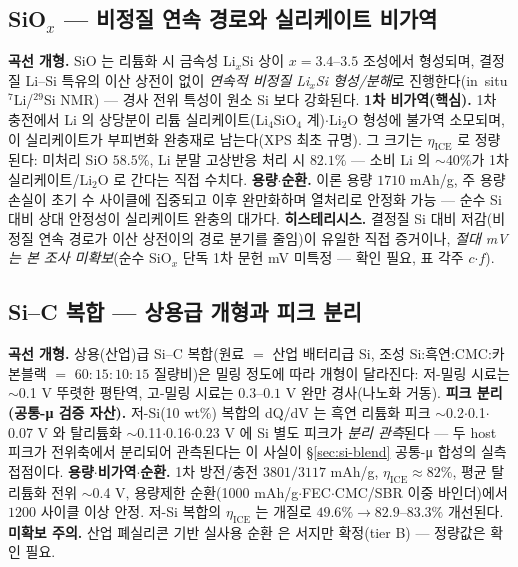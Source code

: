 \subsection{SiO$_x$ --- 비정질 연속 경로와 실리케이트 비가역}\label{ssec:si-siox}
\textbf{곡선 개형.} SiO 는 리튬화 시 금속성 Li$_x$Si 상이 $x{=}3.4$--$3.5$ 조성에서 형성되며, 결정질 Li--Si
특유의 이산 상전이 없이 \emph{연속적 비정질 Li$_x$Si 형성/분해}로 진행한다(in~situ $^7$Li/$^{29}$Si
NMR)\cite{kitada_sio2019} --- 경사 전위 특성이 원소 Si 보다 강화된다. \textbf{1차 비가역(핵심).} 1차
충전에서 Li 의 상당분이 리튬 실리케이트(Li$_4$SiO$_4$ 계)$\cdot$Li$_2$O 형성에 불가역 소모되며, 이
실리케이트가 부피변화 완충재로 남는다(XPS 최초 규명\cite{miyachi_sio2005}). 그 크기는 $\eta_\mathrm{ICE}$
로 정량된다: 미처리 SiO $58.5\%$, Li 분말 고상반응 처리 시 $82.1\%$\cite{yom_sio2016} --- 소비 Li 의
$\sim$40\%가 1차 실리케이트/Li$_2$O 로 간다는 직접 수치다. \textbf{용량$\cdot$순환.} 이론 용량 $1710$
mAh/g, 주 용량손실이 초기 수 사이클에 집중되고 이후 완만화하며 열처리로 안정화 가능\cite{zhang_sio2018}
--- 순수 Si 대비 상대 안정성이 실리케이트 완충의 대가다. \textbf{히스테리시스.} 결정질 Si 대비 저감(비정질
연속 경로가 이산 상전이의 경로 분기를 줄임)이 유일한 직접 증거\cite{kitada_sio2019}이나, \emph{절대 mV 는
본 조사 미확보}(순수 SiO$_x$ 단독 1차 문헌 mV 미특정 --- 확인 필요, 표 각주 $c$$\cdot$$f$).

\subsection{Si--C 복합 --- 상용급 개형과 피크 분리}\label{ssec:si-sic}
\textbf{곡선 개형.} 상용(산업)급 Si--C 복합(원료 $=$ 산업 배터리급 Si, 조성 Si:흑연:CMC:카본블랙 $=$
$60{:}15{:}10{:}15$ 질량비)은 밀링 정도에 따라 개형이 달라진다: 저-밀링 시료는 $\sim$0.1 V 뚜렷한 평탄역, 고-밀링
시료는 $0.3$--$0.1$ V 완만 경사(나노화 거동)\cite{andersen_sic2019}. \textbf{피크 분리(공통-μ 검증
자산).} 저-Si(10 wt\%) 복합의 dQ/dV 는 흑연 리튬화 피크 $\sim$0.2$\cdot$0.1$\cdot$0.07 V 와 탈리튬화
$\sim$0.11$\cdot$0.16$\cdot$0.23 V 에 Si 별도 피크가 \emph{분리 관측}된다\cite{naboka_sic2021} --- 두 host
피크가 전위축에서 분리되어 관측된다는 이 사실이 \S\ref{sec:si-blend} 공통-μ 합성의 실측 접점이다.
\textbf{용량$\cdot$비가역$\cdot$순환.} 1차 방전/충전 $3801/3117$ mAh/g, $\eta_\mathrm{ICE}\approx82\%$,
평균 탈리튬화 전위 $\sim$0.4 V, 용량제한 순환(1000 mAh/g$\cdot$FEC$\cdot$CMC/SBR 이중 바인더)에서 $1200$
사이클 이상 안정\cite{andersen_sic2019}. 저-Si 복합의 $\eta_\mathrm{ICE}$ 는 개질로 $49.6\%\to82.9$--$83.3\%$
개선된다\cite{naboka_sic2021}. \textbf{미확보 주의.} 산업 폐실리콘 기반 실사용 순환\cite{lee_sic2025} 은
서지만 확정(tier B) --- 정량값은 확인 필요.

